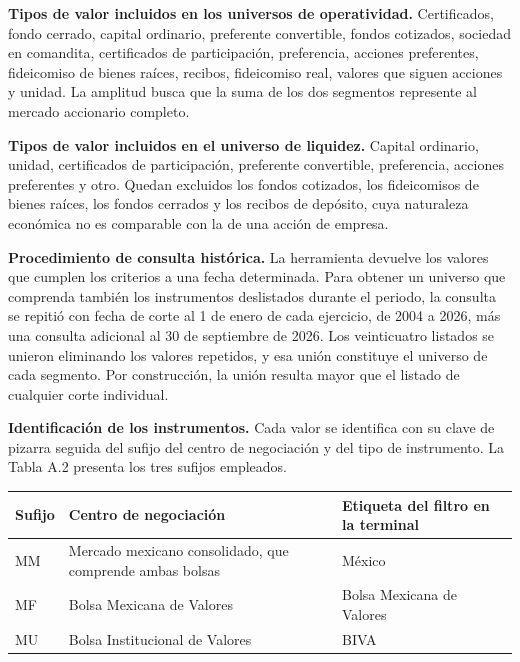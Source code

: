 \textbf{Tipos de valor incluidos en los universos de operatividad.} Certificados, fondo cerrado, capital ordinario, preferente convertible, fondos cotizados, sociedad en comandita, certificados de participación, preferencia, acciones preferentes, fideicomiso de bienes raíces, recibos, fideicomiso real, valores que siguen acciones y unidad. La amplitud busca que la suma de los dos segmentos represente al mercado accionario completo.

\textbf{Tipos de valor incluidos en el universo de liquidez.} Capital ordinario, unidad, certificados de participación, preferente convertible, preferencia, acciones preferentes y otro. Quedan excluidos los fondos cotizados, los fideicomisos de bienes raíces, los fondos cerrados y los recibos de depósito, cuya naturaleza económica no es comparable con la de una acción de empresa.

\textbf{Procedimiento de consulta histórica.} La herramienta devuelve los valores que cumplen los criterios a una fecha determinada. Para obtener un universo que comprenda también los instrumentos deslistados durante el periodo, la consulta se repitió con fecha de corte al 1 de enero de cada ejercicio, de 2004 a 2026, más una consulta adicional al 30 de septiembre de 2026. Los veinticuatro listados se unieron eliminando los valores repetidos, y esa unión constituye el universo de cada segmento. Por construcción, la unión resulta mayor que el listado de cualquier corte individual.

\textbf{Identificación de los instrumentos.} Cada valor se identifica con su clave de pizarra seguida del sufijo del centro de negociación y del tipo de instrumento. La Tabla A.2 presenta los tres sufijos empleados.


{\small
\begin{longtable}[]{@{}
  >{\raggedright\arraybackslash}p{}
  >{\raggedright\arraybackslash}p{}
  >{\raggedright\arraybackslash}p{}@{}}
\toprule\noalign{}
\begin{minipage}[b]{\linewidth}\raggedright
\textbf{Sufijo}
\end{minipage} & \begin{minipage}[b]{\linewidth}\raggedright
\textbf{Centro de negociación}
\end{minipage} & \begin{minipage}[b]{\linewidth}\raggedright
\textbf{Etiqueta del filtro en la terminal}
\end{minipage} \\
\midrule\noalign{}
\endhead
\bottomrule\noalign{}
\endlastfoot
MM & Mercado mexicano consolidado, que comprende ambas bolsas & México \\
MF & Bolsa Mexicana de Valores & Bolsa Mexicana de Valores \\
MU & Bolsa Institucional de Valores & BIVA \\
\end{longtable}
}

